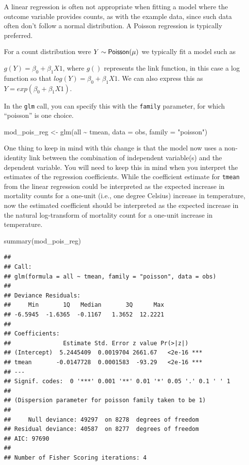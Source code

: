 \documentclass[
]{book}
\newenvironment{Shaded}{\begin{snugshade}}{\end{snugshade}}
\newcommand{\AttributeTok}[1]{\textcolor[rgb]{0.77,0.63,0.00}{#1}}
\newcommand{\FunctionTok}[1]{\textcolor[rgb]{0.00,0.00,0.00}{#1}}
\newcommand{\NormalTok}[1]{#1}
\newcommand{\OtherTok}[1]{\textcolor[rgb]{0.56,0.35,0.01}{#1}}
\newcommand{\SpecialCharTok}[1]{\textcolor[rgb]{0.00,0.00,0.00}{#1}}
\newcommand{\StringTok}[1]{\textcolor[rgb]{0.31,0.60,0.02}{#1}}
\begin{document}
A linear regression is often not appropriate when fitting a model where the
outcome variable provides counts, as with the example data, since such data
often don't follow a normal distribution. A Poisson regression
is typically preferred.

For a count distribution were \(Y \sim {\sf Poisson(\mu)}\) we typically fit a model
such as

\(g(Y)=\beta_{0}+\beta_{1}X1\), where \(g()\) represents the link function, in this
case a log function so that \(log(Y)=\beta_{0}+\beta_{1}X1\). We can also express
this as \(Y=exp(\beta_{0}+\beta_{1}X1)\).

In the \texttt{glm} call, you can specify this with the \texttt{family}
parameter, for which ``poisson'' is one choice.

\begin{Shaded}
\begin{Highlighting}[]
\NormalTok{mod\_pois\_reg }\OtherTok{\textless{}{-}} \FunctionTok{glm}\NormalTok{(all }\SpecialCharTok{\textasciitilde{}}\NormalTok{ tmean, }\AttributeTok{data =}\NormalTok{ obs, }\AttributeTok{family =} \StringTok{"poisson"}\NormalTok{)}
\end{Highlighting}
\end{Shaded}

One thing to keep in mind with this change is that the model now uses a
non-identity link between the combination of independent variable(s) and the
dependent variable. You will need to keep this in mind when you interpret
the estimates of the regression coefficients. While the coefficient estimate
for \texttt{tmean} from the linear regression could be interpreted as the expected
increase in mortality counts for a one-unit (i.e., one degree Celsius) increase
in temperature, now the estimated coefficient should be interpreted as the
expected increase in the natural log-transform of mortality count for a one-unit
increase in temperature.

\begin{Shaded}
\begin{Highlighting}[]
\FunctionTok{summary}\NormalTok{(mod\_pois\_reg)}
\end{Highlighting}
\end{Shaded}

\begin{verbatim}
## 
## Call:
## glm(formula = all ~ tmean, family = "poisson", data = obs)
## 
## Deviance Residuals: 
##     Min       1Q   Median       3Q      Max  
## -6.5945  -1.6365  -0.1167   1.3652  12.2221  
## 
## Coefficients:
##               Estimate Std. Error z value Pr(>|z|)    
## (Intercept)  5.2445409  0.0019704 2661.67   <2e-16 ***
## tmean       -0.0147728  0.0001583  -93.29   <2e-16 ***
## ---
## Signif. codes:  0 '***' 0.001 '**' 0.01 '*' 0.05 '.' 0.1 ' ' 1
## 
## (Dispersion parameter for poisson family taken to be 1)
## 
##     Null deviance: 49297  on 8278  degrees of freedom
## Residual deviance: 40587  on 8277  degrees of freedom
## AIC: 97690
## 
## Number of Fisher Scoring iterations: 4
\end{verbatim}
\end{document}
